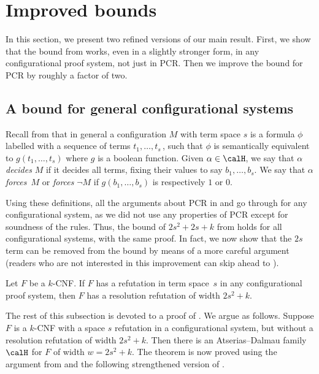 %
\section{Improved bounds}\label{sec:refinements}
%

In this section, we present two refined versions of our main result. 
First, we show that the bound from  
works, even in a slightly stronger form,
in any configurational proof system, not just in PCR.
Then we improve the bound for PCR by roughly a factor of two.


\subsection{A bound for general configurational systems}

Recall from  that in general
 a configuration $M$ with term space $s$ is a formula $\phi$ labelled
with a sequence of terms $t_1, \dots, t_s$\,,
such that $\phi$ is semantically equivalent to $g(t_1, \dots, t_s)$ 
where $g$ is a boolean function. Given $\alpha \in \calH$,
we say that $\alpha$ \emph{decides} $M$ if it decides all terms,
fixing their values to say $b_1, \dots, b_s$.
We say that $\alpha$ \emph{forces}~$M$ or \emph{forces} $\neg M$
 if $g(b_1, \dots, b_s)$ is respectively $1$ or $0$.
 
Using these definitions, all the arguments about PCR  in 
 and 
go through for any configurational system, 
as we did not use any properties of PCR except for soundness of the rules. 
Thus, the bound of $2s^2 + 2s  + k$ from  holds for all configurational systems, with the same proof.
In fact, we now show that the $2s$ term can be removed from the bound by means
of a more careful argument
(readers who are not interested in this improvement 
can skip ahead to ).

\begin{theorem} \label{the:configurational_bound}
Let $F$ be a $k$-CNF. If $F$ has a refutation in term space~$s$
in any configurational proof system, then $F$
has a resolution refutation of width $2s^2 + k$.
\end{theorem}



The rest of this subsection is devoted to a proof of . 
We argue as follows. Suppose $F$ is a $k$-CNF with a space $s$ refutation in a configurational
system, but without a resolution refutation of width $2s^2+k$.
Then there is an Atserias--Dalmau family~$\calH$ for $F$ of width $w = 2s^2+k$.
The theorem is now proved using the argument from 
and the following strengthened version of .

